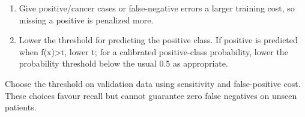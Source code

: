 
\begin{enumerate}[start=1]

\item Give positive/cancer cases or false-negative errors a larger training cost, so missing a positive is penalized more.

\item Lower the threshold for predicting the positive class. If positive is predicted when f(x)>t, lower t; for a calibrated positive-class probability, lower the probability threshold below the usual 0.5 as appropriate.

\end{enumerate}


Choose the threshold on validation data using sensitivity and false-positive cost. These choices favour recall but cannot guarantee zero false negatives on unseen patients.

